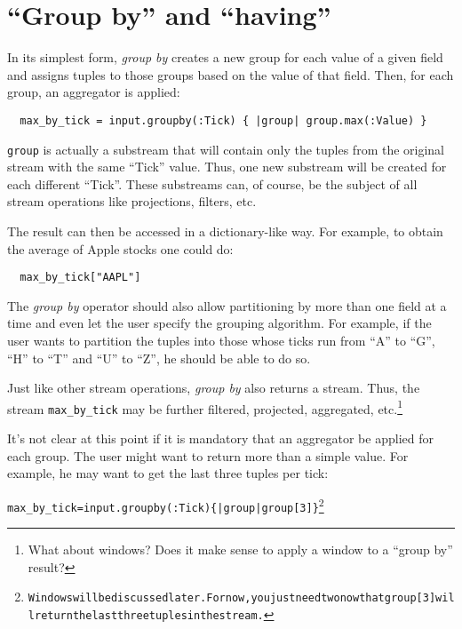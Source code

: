 \documentclass[twoside]{report}
\begin{document}
\section{``Group by'' and ``having''}

In its simplest form, \emph{group by} creates a new group for each value of a given field and assigns tuples to those groups based on the value of that field. Then, for each group, an aggregator is applied:

\begin{verbatim}
  max_by_tick = input.groupby(:Tick) { |group| group.max(:Value) }
\end{verbatim}

\verb=group= is actually a substream that will contain only the tuples from the original stream with the same ``Tick'' value. Thus, one new substream will be created for each different ``Tick''. These substreams can, of course, be the subject of all stream operations like projections, filters, etc.

The result can then be accessed in a dictionary-like way. For example, to obtain the average of Apple stocks one could do:

\begin{verbatim}
  max_by_tick["AAPL"]
\end{verbatim}

The \emph{group by} operator should also allow partitioning by more than one field at a time and even let the user specify the grouping algorithm. For example, if the user wants to partition the tuples into those whose ticks run from ``A'' to ``G'', ``H'' to ``T'' and ``U'' to ``Z'', he should be able to do so.

Just like other stream operations, \emph{group by} also returns a stream. Thus, the stream \verb=max_by_tick= may be further filtered, projected, aggregated, etc.\footnote{What about windows? Does it make sense to apply a window to a ``group by'' result?}

It's not clear at this point if it is mandatory that an aggregator be applied for each group. The user might want to return more than a simple value. For example, he may want to get the last three tuples per tick:

\begin{alltt}
  max_by_tick = input.groupby(:Tick) \{ |group| group[3] \}\footnote{Windows will be discussed later. For now, you just need two now that group[3] will return the last three tuples in the stream.}
\end{alltt}
\end{document}
